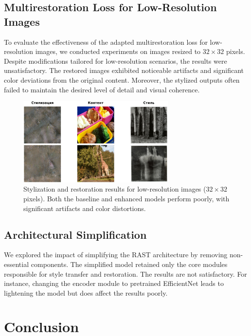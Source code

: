 \documentclass{article}
\begin{document}
\subsection{Multirestoration Loss for Low-Resolution Images}
To evaluate the effectiveness of the adapted multirestoration loss for low-resolution images, we conducted experiments on images resized to $32 \times 32$ pixels. Despite modifications tailored for low-resolution scenarios, the results were unsatisfactory. The restored images exhibited noticeable artifacts and significant color deviations from the original content. Moreover, the stylized outputs often failed to maintain the desired level of detail and visual coherence.

\begin{figure}[H]
    \centering
    \includegraphics[width=0.7\textwidth]{figures/lowres.png}
    \caption{Stylization and restoration results for low-resolution images ($32 \times 32$ pixels). Both the baseline and enhanced models perform poorly, with significant artifacts and color distortions.}
    \label{fig:lowres_results}
\end{figure}

\subsection{Architectural Simplification}
We explored the impact of simplifying the RAST architecture by removing non-essential components. The simplified model retained only the core modules responsible for style transfer and restoration. The results are not satisfactory. For instance, changing the encoder module to pretrained EfficientNet \cite{tan2020efficientnetrethinkingmodelscaling} leads to lightening the model but does affect the results poorly.

\section{Conclusion}
\label{sec:conclusion}
\end{document}
